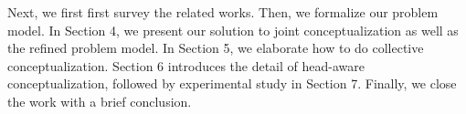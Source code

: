 Next, we first first survey the related works. Then, we formalize our problem model.
In Section 4, we present our solution to joint conceptualization as well as the refined problem model.
In Section 5, we elaborate how to do collective conceptualization. Section 6 introduces the detail of head-aware conceptualization, followed by experimental study in Section 7. Finally, we close the work with a brief conclusion.

%
